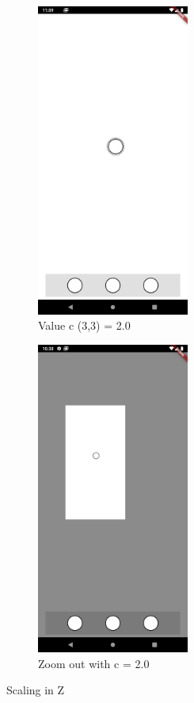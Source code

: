 \begin{figure}[b]
    \begin{subfigure}{0.4\textwidth}
        \centering
        \includegraphics[width=5cm]{Images/App/zscale.png}
        \caption{Value c (3,3) = 2.0}
        \label{fig:zscaledemo}
    \end{subfigure}
    \hfill
    \begin{subfigure}{0.4\textwidth}
        \centering
        \includegraphics[width=5cm]{Images/App/zoomzscale.png}
        \caption{Zoom out with c = 2.0}
        \label{fig:zoomzscale}
    \end{subfigure}
    \caption{Scaling in Z}
    \label{fig:zscale}
\end{figure}

